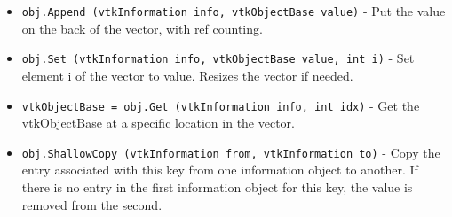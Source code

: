 \begin{itemize}
\item  \verb|obj.Append (vtkInformation info, vtkObjectBase value)| -  Put the value on the back of the vector, with ref counting.

\item  \verb|obj.Set (vtkInformation info, vtkObjectBase value, int i)| -  Set element i of the vector to value. Resizes the vector
 if needed.

\item  \verb|vtkObjectBase = obj.Get (vtkInformation info, int idx)| -  Get the vtkObjectBase at a specific location in the vector.

\item  \verb|obj.ShallowCopy (vtkInformation from, vtkInformation to)| -  Copy the entry associated with this key from one information
 object to another.  If there is no entry in the first information
 object for this key, the value is removed from the second.

\end{itemize}
